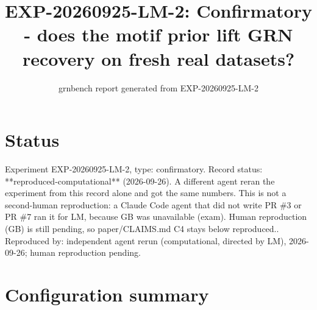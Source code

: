 \documentclass{article}
\title{EXP-20260925-LM-2: Confirmatory - does the motif prior lift GRN recovery on fresh real datasets?}
\author{grnbench report generated from EXP-20260925-LM-2}
\date{}
\begin{document}
\maketitle
\section*{Status}
Experiment EXP-20260925-LM-2, type: confirmatory. Record status: **reproduced-computational** (2026-09-26). A different agent reran the experiment from this record alone and got the same numbers. This is not a second-human reproduction: a Claude Code agent that did not write PR \#3 or PR \#7 ran it for LM, because GB was unavailable (exam). Human reproduction (GB) is still pending, so paper/CLAIMS.md C4 stays below reproduced.. Reproduced by: independent agent rerun (computational, directed by LM), 2026-09-26; human reproduction pending.
\section{Configuration summary}

\end{document}
